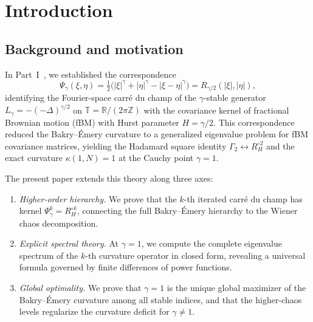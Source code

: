 \documentclass[11pt,a4paper]{article}
\theoremstyle{plain}
\theoremstyle{definition}
\theoremstyle{remark}
\newcommand{\R}{\mathbb{R}}
\newcommand{\Z}{\mathbb{Z}}
\newcommand{\T}{\mathbb{T}}
\begin{document}
\section{Introduction}\label{sec:intro}

\subsection{Background and motivation}

In Part~I~\cite{Fontes2026b}, we established the correspondence
\begin{equation}\label{eq:part1-duality}
  \Psi_\gamma(\xi,\eta)
  = \tfrac{1}{2}\bigl(|\xi|^\gamma + |\eta|^\gamma
    - |\xi - \eta|^\gamma\bigr)
  = R_{\gamma/2}(|\xi|,|\eta|),
\end{equation}
identifying the Fourier-space carr\'e du champ of the
$\gamma$-stable generator $L_\gamma = -(-\Delta)^{\gamma/2}$ on
$\T = \R/(2\pi\Z)$ with the covariance kernel of fractional
Brownian motion (fBM) with Hurst parameter $H = \gamma/2$.
This correspondence reduced the Bakry--\'Emery curvature to
a generalized eigenvalue problem for fBM covariance matrices,
yielding the Hadamard square identity
$\Gamma_2 \leftrightarrow R_H^{\circ 2}$
and the exact curvature $\kappa(1,N) = 1$ at the
Cauchy point $\gamma = 1$.

The present paper extends this theory along three axes:
\begin{enumerate}[label=(\alph*)]
\item \emph{Higher-order hierarchy.}
  We prove that the $k$-th iterated carr\'e du champ has kernel
  $\Psi_\gamma^k = R_H^{\circ k}$, connecting the full
  Bakry--\'Emery hierarchy to the Wiener chaos decomposition.

\item \emph{Explicit spectral theory.}
  At $\gamma = 1$, we compute the complete eigenvalue spectrum
  of the $k$-th curvature operator in closed form,
  revealing a universal formula governed by finite differences
  of power functions.

\item \emph{Global optimality.}
  We prove that $\gamma = 1$ is the unique global maximizer
  of the Bakry--\'Emery curvature among all stable indices,
  and that the higher-chaos levels regularize the curvature
  deficit for $\gamma \neq 1$.
\end{enumerate}
\end{document}
